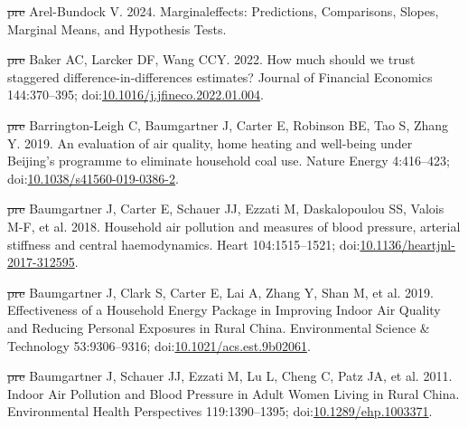 \documentclass[
  letterpaper,
  DIV=11,
  numbers=noendperiod]{scrartcl}
\newlength{\cslhangindent}
\newenvironment{CSLReferences}[2] %
 {\begin{list}{}{%
  \setlength{\itemindent}{0pt} %
  \setlength{\leftmargin}{0pt} %
  \setlength{\parsep}{0pt} %
  \ifodd #1
   \setlength{\leftmargin}{\cslhangindent} %
   \setlength{\itemindent}{-1\cslhangindent} %
  \fi
  \setlength{\itemsep}{#2\baselineskip}}} %
 {\end{list}} %
\providecommand{\DIFdeltex}[1]{{\protect\color{red}\sout{#1}}}                      %
\providecommand{\DIFaddbegin}{} %
\providecommand{\DIFaddend}{} %
\providecommand{\DIFdelbegin}{} %
\providecommand{\DIFdelend}{} %
\providecommand{\DIFdel}[1]{\texorpdfstring{\DIFdeltex{#1}}{}} %
\newcommand{\DIFscaledelfig}{0.5}
\newlength{\DIFdelgraphicswidth} %
\newlength{\DIFdelgraphicsheight} %
\newcommand{\DIFaddincludegraphics}[2][]{{\color{blue}\fbox{\DIFOincludegraphics[#1]{#2}}}} %
\newcommand{\DIFdelincludegraphics}[2][]{%
\sbox{\DIFdelgraphicsbox}{\DIFOincludegraphics[#1]{#2}}%
\settoboxwidth{\DIFdelgraphicswidth}{\DIFdelgraphicsbox} %
\settoboxtotalheight{\DIFdelgraphicsheight}{\DIFdelgraphicsbox} %
\scalebox{\DIFscaledelfig}{%
\parbox[b]{\DIFdelgraphicswidth}{\usebox{\DIFdelgraphicsbox}\\[-\baselineskip] \rule{\DIFdelgraphicswidth}{0em}}\llap{\resizebox{\DIFdelgraphicswidth}{\DIFdelgraphicsheight}{%
\setlength{\unitlength}{\DIFdelgraphicswidth}%
\begin{picture}(1,1)%
\thicklines\linethickness{2pt} %
{\color[rgb]{1,0,0}\put(0,0){\framebox(1,1){}}}%
{\color[rgb]{1,0,0}\put(0,0){\line( 1,1){1}}}%
{\color[rgb]{1,0,0}\put(0,1){\line(1,-1){1}}}%
\end{picture}%
}\hspace*{3pt}}} %
} %
\DeclareRobustCommand{\DIFaddbegin}{\DIFOaddbegin \let\includegraphics\DIFaddincludegraphics} %
\DeclareRobustCommand{\DIFaddend}{\DIFOaddend \let\includegraphics\DIFOincludegraphics} %
\DeclareRobustCommand{\DIFdelbegin}{\DIFOdelbegin \let\includegraphics\DIFdelincludegraphics} %
\DeclareRobustCommand{\DIFdelend}{\DIFOaddend \let\includegraphics\DIFOincludegraphics} %
\begin{document}
\begin{CSLReferences}{1}{1}
\DIFdelbegin %
\DIFdel{pre}%
\DIFdelend \DIFaddbegin {}
\DIFaddend Arel-Bundock V. 2024. Marginaleffects: {Predictions}, {Comparisons},
{Slopes}, {Marginal Means}, and {Hypothesis Tests}.

\DIFdelbegin %
\DIFdel{pre}%
\DIFdelend \DIFaddbegin {}
\DIFaddend Baker AC, Larcker DF, Wang CCY. 2022. How much should we trust staggered
difference-in-differences estimates? Journal of Financial Economics
144:370--395;
doi:\href{https://doi.org/10.1016/j.jfineco.2022.01.004}{10.1016/j.jfineco.2022.01.004}.

\DIFdelbegin %
\DIFdel{pre}%
\DIFdelend \DIFaddbegin {}
\DIFaddend Barrington-Leigh C, Baumgartner J, Carter E, Robinson BE, Tao S, Zhang
Y. 2019. An evaluation of air quality, home heating and well-being under
{Beijing}'s programme to eliminate household coal use. Nature Energy
4:416--423;
doi:\href{https://doi.org/10.1038/s41560-019-0386-2}{10.1038/s41560-019-0386-2}.

\DIFdelbegin %
\DIFdel{pre}%
\DIFdelend \DIFaddbegin {}
\DIFaddend Baumgartner J, Carter E, Schauer JJ, Ezzati M, Daskalopoulou SS, Valois
M-F, et al. 2018. Household air pollution and measures of blood
pressure, arterial stiffness and central haemodynamics. Heart
104:1515--1521;
doi:\href{https://doi.org/10.1136/heartjnl-2017-312595}{10.1136/heartjnl-2017-312595}.

\DIFdelbegin %
\DIFdel{pre}%
\DIFdelend \DIFaddbegin {}
\DIFaddend Baumgartner J, Clark S, Carter E, Lai A, Zhang Y, Shan M, et al. 2019.
Effectiveness of a {Household Energy Package} in {Improving Indoor Air
Quality} and {Reducing Personal Exposures} in {Rural China}.
Environmental Science \& Technology 53:9306--9316;
doi:\href{https://doi.org/10.1021/acs.est.9b02061}{10.1021/acs.est.9b02061}.

\DIFdelbegin %
\DIFdel{pre}%
\DIFdelend \DIFaddbegin {}
\DIFaddend Baumgartner J, Schauer JJ, Ezzati M, Lu L, Cheng C, Patz JA, et al.
2011. Indoor {Air Pollution} and {Blood Pressure} in {Adult Women
Living} in {Rural China}. Environmental Health Perspectives
119:1390--1395;
doi:\href{https://doi.org/10.1289/ehp.1003371}{10.1289/ehp.1003371}.


\end{CSLReferences}
\end{document}

